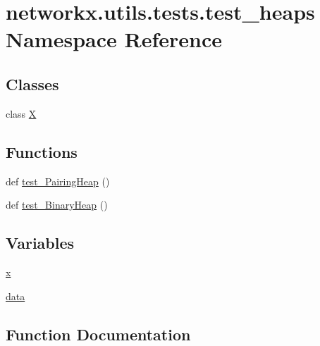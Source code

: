 \hypertarget{namespacenetworkx_1_1utils_1_1tests_1_1test__heaps}{}\section{networkx.\+utils.\+tests.\+test\+\_\+heaps Namespace Reference}
\label{namespacenetworkx_1_1utils_1_1tests_1_1test__heaps}
\subsection*{Classes}
\begin{DoxyCompactItemize}
\item 
class \hyperlink{classnetworkx_1_1utils_1_1tests_1_1test__heaps_1_1X}{X}
\end{DoxyCompactItemize}
\subsection*{Functions}
\begin{DoxyCompactItemize}
\item 
def \hyperlink{namespacenetworkx_1_1utils_1_1tests_1_1test__heaps_adc8a2a6e1b5dfd877138dedfbc81cf7c}{test\+\_\+\+Pairing\+Heap} ()
\item 
def \hyperlink{namespacenetworkx_1_1utils_1_1tests_1_1test__heaps_a32fbebd4365195f2d7eebaa351a4f4cb}{test\+\_\+\+Binary\+Heap} ()
\end{DoxyCompactItemize}
\subsection*{Variables}
\begin{DoxyCompactItemize}
\item 
\hyperlink{namespacenetworkx_1_1utils_1_1tests_1_1test__heaps_adde087eff74f666c67c637aa8c7b2b2a}{x}
\item 
\hyperlink{namespacenetworkx_1_1utils_1_1tests_1_1test__heaps_a0d4d1884d3ee159ed9682a8ef06fd7d1}{data}
\end{DoxyCompactItemize}


\subsection{Function Documentation}
\mbox{\label{namespacenetworkx_1_1utils_1_1tests_1_1test__heaps_a32fbebd4365195f2d7eebaa351a4f4cb}} 

